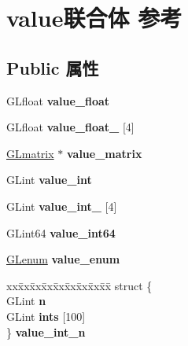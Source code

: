 \hypertarget{unionvalue}{}\section{value联合体 参考}
\label{unionvalue}
\subsection*{Public 属性}
\begin{DoxyCompactItemize}
\item 
\mbox{\label{unionvalue_a5b559a1a136d7bd5c23403166e19f130}} 
G\+Lfloat {\bfseries value\+\_\+float}
\item 
\mbox{\label{unionvalue_a53b3ffc3be76584f32183a4b18d850c9}} 
G\+Lfloat {\bfseries value\+\_\+float\+\_} \mbox{[}4\mbox{]}
\item 
\mbox{\label{unionvalue_a3cac4b20ff05fa86970d9becdf81f37b}} 
\hyperlink{struct_g_lmatrix}{G\+Lmatrix} $\ast$ {\bfseries value\+\_\+matrix}
\item 
\mbox{\label{unionvalue_acdd0e929faed18002841c7070ba58245}} 
G\+Lint {\bfseries value\+\_\+int}
\item 
\mbox{\label{unionvalue_ac7ba2709be20eae9ff0f48b9e5b06043}} 
G\+Lint {\bfseries value\+\_\+int\+\_} \mbox{[}4\mbox{]}
\item 
\mbox{\label{unionvalue_a738393129923719b754eaa4004d25e44}} 
G\+Lint64 {\bfseries value\+\_\+int64}
\item 
\mbox{\label{unionvalue_a5550a5463821ee0e5c26ee28aea8de31}} 
\hyperlink{interfacevoid}{G\+Lenum} {\bfseries value\+\_\+enum}
\item 
\mbox{\label{unionvalue_a8dbfe97914aa7e82007419b26cc64320}} 
\begin{tabbing}
xx\=xx\=xx\=xx\=xx\=xx\=xx\=xx\=xx\=\kill
struct \{\\
\>GLint {\bfseries n}\\
\>GLint {\bfseries ints} \mbox{[}100\mbox{]}\\
\} {\bfseries value\_int\_n}\\


\end{tabbing}
\end{DoxyCompactItemize}
